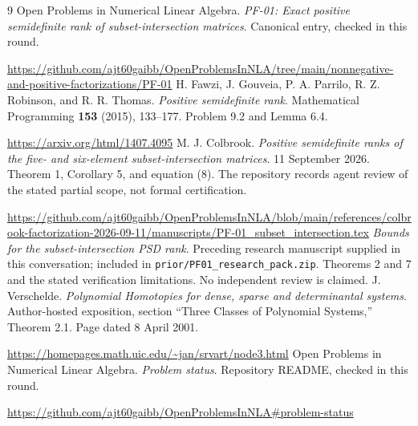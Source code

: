 \documentclass[11pt]{article}
\theoremstyle{remark}\newtheorem{remark}[theorem]{Remark}
\begin{document}
\begingroup
\small
\setlength{\parskip}{2pt}
\begin{thebibliography}{9}
\setlength{\itemsep}{2pt}
 Open Problems in Numerical Linear Algebra. \emph{PF-01: Exact positive semidefinite rank of subset-intersection matrices}. Canonical entry, checked in this round.\par
\url{https://github.com/ajt60gaibb/OpenProblemsInNLA/tree/main/nonnegative-and-positive-factorizations/PF-01}
 H. Fawzi, J. Gouveia, P. A. Parrilo, R. Z. Robinson, and R. R. Thomas. \emph{Positive semidefinite rank}. Mathematical Programming \textbf{153} (2015), 133--177. Problem 9.2 and Lemma 6.4.\par
\url{https://arxiv.org/html/1407.4095}
 M. J. Colbrook. \emph{Positive semidefinite ranks of the five- and six-element subset-intersection matrices}. 11 September 2026. Theorem 1, Corollary 5, and equation (8). The repository records agent review of the stated partial scope, not formal certification.\par
\url{https://github.com/ajt60gaibb/OpenProblemsInNLA/blob/main/references/colbrook-factorization-2026-09-11/manuscripts/PF-01_subset_intersection.tex}
 \emph{Bounds for the subset-intersection PSD rank}. Preceding research manuscript supplied in this conversation; included in \texttt{prior/PF01\_research\_pack.zip}. Theorems 2 and 7 and the stated verification limitations. No independent review is claimed.
 J. Verschelde. \emph{Polynomial Homotopies for dense, sparse and determinantal systems}. Author-hosted exposition, section ``Three Classes of Polynomial Systems,'' Theorem 2.1. Page dated 8 April 2001.\par
\url{https://homepages.math.uic.edu/~jan/srvart/node3.html}
 Open Problems in Numerical Linear Algebra. \emph{Problem status}. Repository README, checked in this round.\par
\url{https://github.com/ajt60gaibb/OpenProblemsInNLA#problem-status}
\end{thebibliography}
\endgroup
\end{document}

